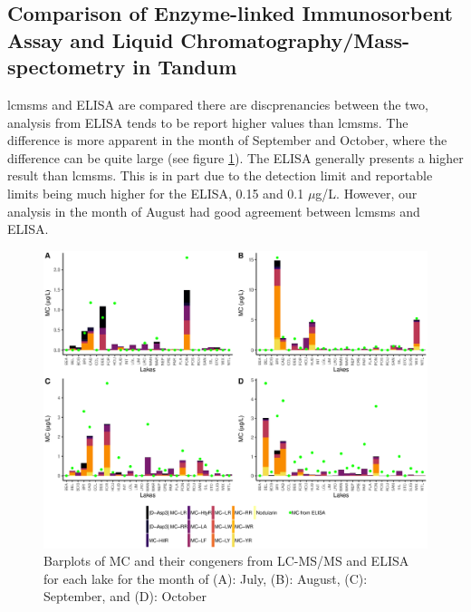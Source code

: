 \subsection{Comparison of Enzyme-linked Immunosorbent Assay and Liquid Chromatography/Mass-spectometry in Tandum}

\gls{lcmsms} and ELISA are compared there are discprenancies between the two, analysis from ELISA tends to be report higher values than \gls{lcmsms}. The difference is more apparent in the month of September and October, where the difference can be quite large (see figure \ref{fig:month}). The ELISA generally presents a higher result than \gls{lcmsms}. This is in part due to the detection limit and reportable limits being much higher for the ELISA, 0.15 and 0.1 $\mu$g/L. However, our analysis in the month of August had good agreement between \gls{lcmsms} and ELISA.  

\begin{figure} 
\includegraphics[width=\textwidth]{figures/month}
\caption{
Barplots of MC and their congeners from LC-MS/MS and ELISA  for each lake for the month of 
(A): July, 
(B): August,
(C): September, and
(D): October 
}
	\label{fig:month} 
\end{figure}





